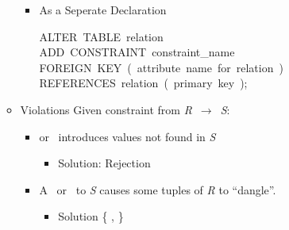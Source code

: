 \documentclass{article}
\begin{document}
\begin{itemize}
\begin{itemize}
\begin{itemize}
\item{}
As a Seperate Declaration%
\begin{mdpre}%
\noindent ALTER~TABLE~relation\\
ADD~CONSTRAINT~constraint\_name\\
FOREIGN~KEY~(~attribute~name~for~relation~)\\
REFERENCES~relation~(~primary~key~);%
\end{mdpre}%
\end{itemize}%

\item{}
Violations
Given constraint from \emph{R}~\ensuremath{\rightarrow}~\emph{S}:%

\begin{itemize}[noitemsep,topsep=\mdcompacttopsep]%

\item{} or~
introduces values not found in \emph{S}

\begin{itemize}[noitemsep,topsep=\mdcompacttopsep]%

\item{}Solution: Rejection%
\end{itemize}%

\item{}A~ or~ to \emph{S}
causes some tuples of \emph{R} to \textquotedblleft{}dangle\textquotedblright{}.

\begin{itemize}[noitemsep,topsep=\mdcompacttopsep]%

\item{}Solution \{ ,  \}

\begin{itemize}[noitemsep,topsep=\mdcompacttopsep]%


\end{itemize}
\end{itemize}
\end{itemize}
\end{itemize}
\end{itemize}
\end{document}
